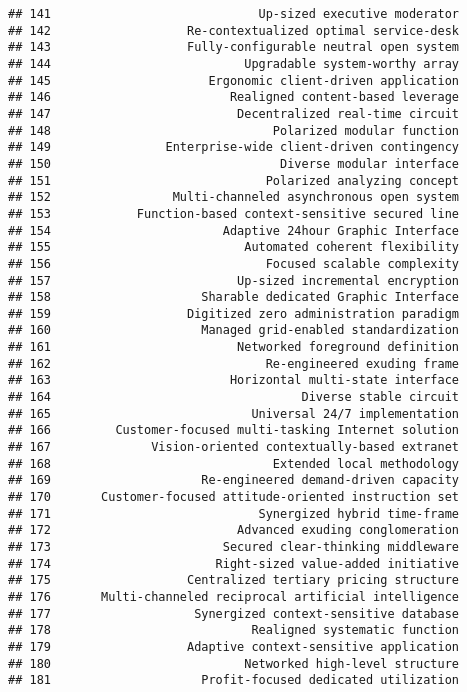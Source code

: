 \documentclass[
]{article}
\begin{document}
\begin{verbatim}
## 141                             Up-sized executive moderator
## 142                   Re-contextualized optimal service-desk
## 143                   Fully-configurable neutral open system
## 144                           Upgradable system-worthy array
## 145                      Ergonomic client-driven application
## 146                         Realigned content-based leverage
## 147                          Decentralized real-time circuit
## 148                               Polarized modular function
## 149                Enterprise-wide client-driven contingency
## 150                                Diverse modular interface
## 151                              Polarized analyzing concept
## 152                 Multi-channeled asynchronous open system
## 153            Function-based context-sensitive secured line
## 154                        Adaptive 24hour Graphic Interface
## 155                           Automated coherent flexibility
## 156                              Focused scalable complexity
## 157                          Up-sized incremental encryption
## 158                     Sharable dedicated Graphic Interface
## 159                   Digitized zero administration paradigm
## 160                     Managed grid-enabled standardization
## 161                          Networked foreground definition
## 162                              Re-engineered exuding frame
## 163                         Horizontal multi-state interface
## 164                                   Diverse stable circuit
## 165                            Universal 24/7 implementation
## 166         Customer-focused multi-tasking Internet solution
## 167              Vision-oriented contextually-based extranet
## 168                               Extended local methodology
## 169                     Re-engineered demand-driven capacity
## 170       Customer-focused attitude-oriented instruction set
## 171                             Synergized hybrid time-frame
## 172                          Advanced exuding conglomeration
## 173                        Secured clear-thinking middleware
## 174                       Right-sized value-added initiative
## 175                   Centralized tertiary pricing structure
## 176       Multi-channeled reciprocal artificial intelligence
## 177                    Synergized context-sensitive database
## 178                            Realigned systematic function
## 179                   Adaptive context-sensitive application
## 180                           Networked high-level structure
## 181                     Profit-focused dedicated utilization

\end{verbatim}
\end{document}
